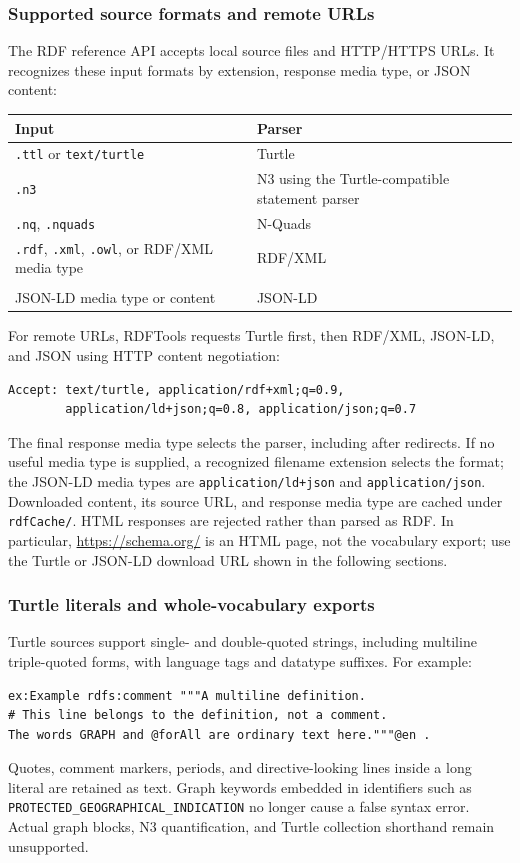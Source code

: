 \documentclass[10pt,letterpaper]{article}
\begin{document}
\subsubsection{Supported source formats and remote URLs}

The RDF reference API accepts local source files and HTTP/HTTPS URLs. It
recognizes these input formats by extension, response media type, or JSON
content:
\begin{longtable}{p{.30\linewidth}p{.58\linewidth}}
\textbf{Input} & \textbf{Parser}\\
\hline
\texttt{.ttl} or \texttt{text/turtle} & Turtle\\
\texttt{.n3} & N3 using the Turtle-compatible statement parser\\
\texttt{.nq}, \texttt{.nquads} & N-Quads\\
\texttt{.rdf}, \texttt{.xml}, \texttt{.owl}, or RDF/XML media type & RDF/XML\\
\shortstack[l]{\texttt{.jsonld}, \texttt{.json},\\JSON-LD media type or content} & JSON-LD\\
\end{longtable}

For remote URLs, RDFTools requests Turtle first, then RDF/XML, JSON-LD, and
JSON using HTTP content negotiation:
\begin{lstlisting}
Accept: text/turtle, application/rdf+xml;q=0.9,
        application/ld+json;q=0.8, application/json;q=0.7
\end{lstlisting}
The final response media type selects the parser, including after redirects.
If no useful media type is supplied, a recognized filename extension selects
the format; the JSON-LD media types are \texttt{application/ld+json} and
\texttt{application/json}. Downloaded content, its source URL, and response
media type are cached under \texttt{rdfCache/}.
HTML responses are rejected rather than parsed as RDF. In particular,
\url{https://schema.org/} is an HTML page, not the vocabulary export; use the
Turtle or JSON-LD download URL shown in the following sections.

\subsubsection{Turtle literals and whole-vocabulary exports}

Turtle sources support single- and double-quoted strings, including
multiline triple-quoted forms, with language tags and datatype suffixes.
For example:
\begin{lstlisting}
ex:Example rdfs:comment """A multiline definition.
# This line belongs to the definition, not a comment.
The words GRAPH and @forAll are ordinary text here."""@en .
\end{lstlisting}
Quotes, comment markers, periods, and directive-looking lines inside a
long literal are retained as text. Graph keywords embedded in identifiers
such as \texttt{PROTECTED\_GEOGRAPHICAL\_INDICATION} no longer cause a
false syntax error. Actual graph blocks, N3 quantification, and Turtle
collection shorthand remain unsupported.
\end{document}
